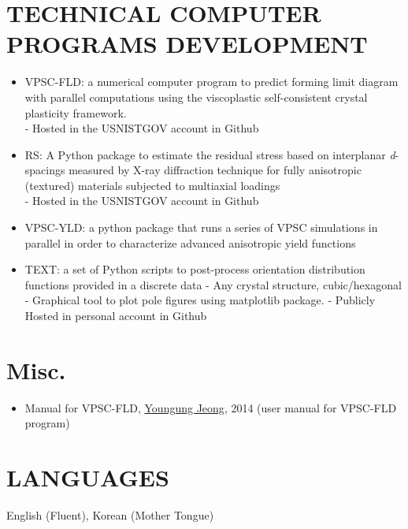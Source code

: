 \documentclass{res}
\begin{document}
\begin{resume}
  \section{TECHNICAL COMPUTER PROGRAMS DEVELOPMENT}
  \begin{itemize}
  \item VPSC-FLD: a numerical computer program to predict forming limit diagram with parallel computations using the viscoplastic self-consistent crystal plasticity framework.\\
    - Hosted in the USNISTGOV account in Github
  \item RS: A Python package to estimate the residual stress based on interplanar \emph{d}-spacings measured by X-ray diffraction technique for fully anisotropic (textured) materials subjected to multiaxial loadings\\
    - Hosted in the USNISTGOV account in Github
  \item VPSC-YLD: a python package that runs a series of VPSC simulations in parallel in order to characterize advanced anisotropic yield functions
  \item TEXT: a set of Python scripts to post-process orientation distribution functions provided in a discrete data
    - Any crystal structure, cubic/hexagonal
    - Graphical tool to plot pole figures using matplotlib package.
    - Publicly Hosted in personal account in Github
  \end{itemize}

    \section{Misc.}
  \begin{itemize}
  \item Manual for VPSC-FLD, \underline{Youngung Jeong}, 2014 (user manual for VPSC-FLD program)
  \end{itemize}

  \section{LANGUAGES}
  English (Fluent), Korean (Mother Tongue)


\end{resume}
\end{document}
